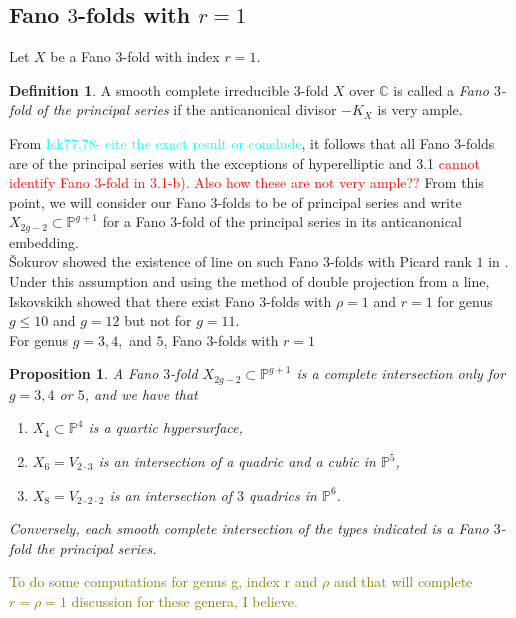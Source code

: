 \documentclass[11pt]{amsart}
\theoremstyle{plain}
\newtheorem{proposition}[theorem]{Proposition}
\theoremstyle{definition}
\newtheorem{definition}[theorem]{Definition}
\theoremstyle{expl}
\begin{document}
\subsection{Fano $3$-folds with $r=1$}	
Let $X$ be a Fano $3$-fold with index $r=1$.
\begin{definition}
    A smooth complete irreducible $3$-fold $X$ over $\mathbb{C}$ is called a \textit{Fano $3$-fold of the principal series} if the anticanonical divisor $-K_X$ is very ample.
\end{definition}
From \textcolor{cyan}{Isk77,78- cite the exact result or conclude}, it follows that all Fano $3$-folds are of the principal series with the exceptions of hyperelliptic and 3.1 \textcolor{red}{cannot identify Fano $3$-fold in 3.1-b). Also how these are not very ample??} From this point, we will consider our Fano $3$-folds to be of principal series and write $X_{2g-2} \subset \mathbb{P}^{g+1}$ for a Fano $3$-fold of the principal series in its anticanonical embedding.\\
\v{S}okurov showed the existence of line on such Fano $3$-folds with Picard rank $1$ in \cite{Sokuline}. Under this assumption and using the method of double projection from a line, Iskovskikh showed that there exist Fano $3$-folds with $\rho =1$ and $r=1$ for genus $g \leq 10$ and $g=12$ but not for $g=11$.\\
For genus $g=3, 4,$ and $5$, Fano $3$-folds with $r=1$
\begin{proposition}
    A Fano $3$-fold $X_{2g-2}\subset \mathbb{P}^{g+1}$ is a complete intersection only for $g=3, 4$ or $5$, and we have that 
    \begin{enumerate}
    \item[1-2 a):] $X_4 \subset \mathbb{P}^4$ is a quartic hypersurface,
    \item[1-3 :] $X_6 = V_{2\cdot 3}$ is an intersection of a quadric and a cubic in $\mathbb{P}^5$,
    \item[1-4 :] $X_8 = V_{2\cdot 2\cdot 2}$ is an intersection of $3$ quadrics in $\mathbb{P}^6$.
    \end{enumerate}
    Conversely, each smooth complete intersection of the types indicated is a Fano $3$-fold the principal series. 
\end{proposition}
\textcolor{olive}{To do some computations for genus g, index r and $\rho$ and that will complete $r=\rho=1$ discussion for these genera, I believe.}
 
\end{document}

